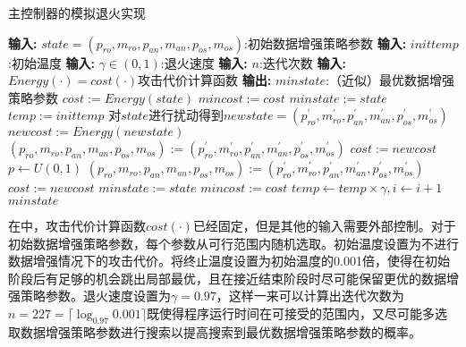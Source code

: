 {	\begin{breakablealgorithm}
		\caption{主控制器的模拟退火实现}\label{alg:saincontroller}
		\begin{algorithmic}[1]
			\Statex \textbf{输入:} $state=(p_{ro},m_{ro},p_{an},m_{an},p_{os},m_{os})$:初始数据增强策略参数
			\Statex \textbf{输入:} $inittemp$:初始温度
			\Statex \textbf{输入:} $\gamma\in(0,1)$:退火速度
			\Statex \textbf{输入:} $n$:迭代次数
			\Statex \textbf{输入:} $Energy(\cdot)=cost(\cdot)$攻击代价计算函数
			\Statex \textbf{输出:} $minstate$:（近似）最优数据增强策略参数
			\State $cost := Energy(state)$
			\State $mincost:=cost$
			\State $minstate:=state$
			\State $temp:=inittemp$
			\Repeat
			\State 对$state$进行扰动得到$newstate=(p_{ro}^\prime,m_{ro}^\prime,p_{an}^\prime,m_{an}^\prime,p_{os}^\prime,m_{os}^\prime)$
			\State $newcost:=Energy(newstate)$
			\State $(p_{ro},m_{ro},p_{an},m_{an},p_{os},m_{os}):=(p_{ro}^\prime,m_{ro}^\prime,p_{an}^\prime,m_{an}^\prime,p_{os}^\prime,m_{os}^\prime)$
			\State $cost:= newcost$
			\Else
			\State $p\gets U(0,1)$
			\State $(p_{ro},m_{ro},p_{an},m_{an},p_{os},m_{os}):=(p_{ro}^\prime,m_{ro}^\prime,p_{an}^\prime,m_{an}^\prime,p_{os}^\prime,m_{os}^\prime)$
			\State$cost:= newcost$
			\EndIf
			\EndIf
			\State $minstate:= state$
			\State $mincost:= cost$
			\EndIf
			\State $temp\gets temp\times\gamma,i\gets i+1$
			\EndFor
			\State \Return $minstate$
		\end{algorithmic}
	\end{breakablealgorithm}
	
	在中，攻击代价计算函数$cost(\cdot)$已经固定，但是其他的输入需要外部控制。对于初始数据增强策略参数，每个参数从可行范围内随机选取。初始温度设置为不进行数据增强情况下的攻击代价。将终止温度设置为初始温度的0.001倍，使得在初始阶段后有足够的机会跳出局部最优，且在接近结束阶段时尽可能保留更优的数据增强策略参数。退火速度设置为$\gamma=0.97$，这样一来可以计算出迭代次数为$n=227=\lceil\log_{0.97}0.001\rceil$既使得程序运行时间在可接受的范围内，又尽可能多选取数据增强策略参数进行搜索以提高搜索到最优数据增强策略参数的概率。
	
}
